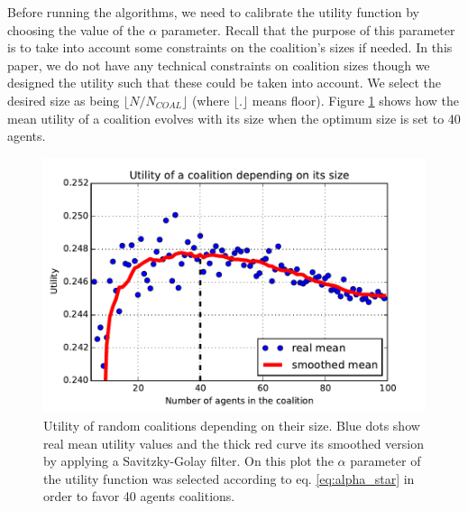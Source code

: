 \documentclass[journal]{IEEEtran}
\begin{document}
Before running the algorithms, we need to calibrate the utility function by choosing the value of the $ \alpha $ parameter. Recall that the purpose of this parameter is to take into account some constraints on the coalition's sizes if needed. In this paper, we do not have any technical constraints on coalition sizes though we designed the utility such that these could be taken into account. We select the desired size as being $ \lfloor N/N_{COAL} \rfloor $ (where $ \lfloor.\rfloor $ means floor). Figure \ref{fig:real_utility2} shows how the mean utility of a coalition evolves with its size when the optimum size is set to 40 agents.
\begin{figure}
\includegraphics[scale=.48]{./figs/figure_4}
\caption{{\footnotesize Utility of random coalitions depending on their size. Blue dots show real mean utility values and the thick red curve its smoothed version by applying a Savitzky-Golay filter. On this plot the $ \alpha $ parameter of the utility function was selected according to eq. \ref{eq:alpha_star} in order to favor 40 agents coalitions.}}
\label{fig:real_utility2}
\end{figure}
\end{document}
